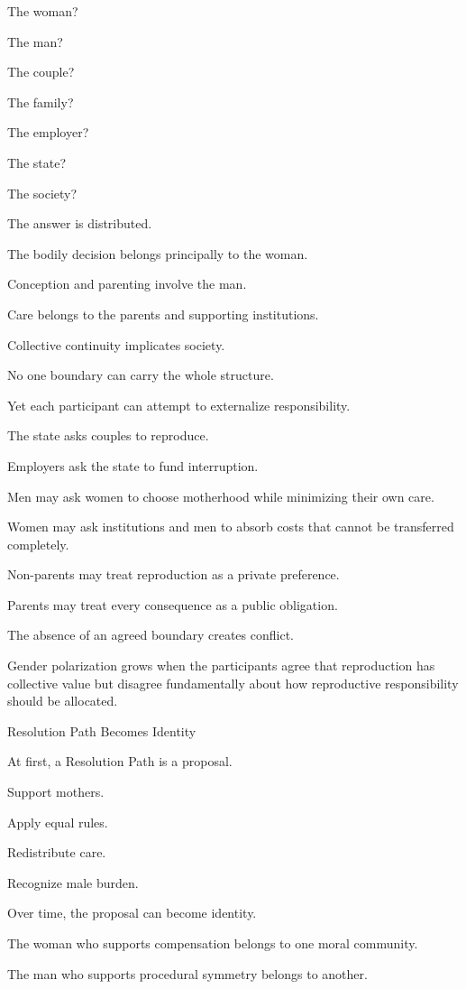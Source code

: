 The woman?

The man?

The couple?

The family?

The employer?

The state?

The society?

The answer is distributed.

The bodily decision belongs principally to the woman.

Conception and parenting involve the man.

Care belongs to the parents and supporting institutions.

Collective continuity implicates society.

No one boundary can carry the whole structure.

Yet each participant can attempt to externalize responsibility.

The state asks couples to reproduce.

Employers ask the state to fund interruption.

Men may ask women to choose motherhood while minimizing their own care.

Women may ask institutions and men to absorb costs that cannot be transferred completely.

Non-parents may treat reproduction as a private preference.

Parents may treat every consequence as a public obligation.

The absence of an agreed boundary creates conflict.

Gender polarization grows when the participants agree that reproduction has collective value but disagree fundamentally about how reproductive responsibility should be allocated.

Resolution Path Becomes Identity

At first, a Resolution Path is a proposal.

Support mothers.

Apply equal rules.

Redistribute care.

Recognize male burden.

Over time, the proposal can become identity.

The woman who supports compensation belongs to one moral community.

The man who supports procedural symmetry belongs to another.

